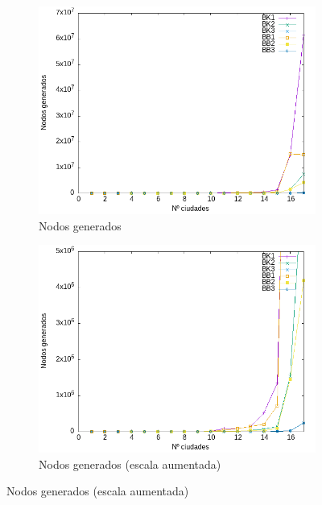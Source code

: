 \documentclass{article}
\begin{document}
\begin{figure}[H]
    \centering
    \begin{subfigure}[b]{0.45\textwidth}
        \centering
        \includegraphics[width=\textwidth]{Sucio_Olga/img/Comparativa_nodos_linespoints.png}
        \caption{Nodos generados}
    \end{subfigure}
    \begin{subfigure}[b]{0.45\textwidth}
        \centering %
        \includegraphics[width=\textwidth]{Sucio_Olga/img/Comparativa_nodos_linespointsAcotado.png}
        \caption{Nodos generados (escala aumentada)}
    \end{subfigure}
\end{figure}
\end{document}
